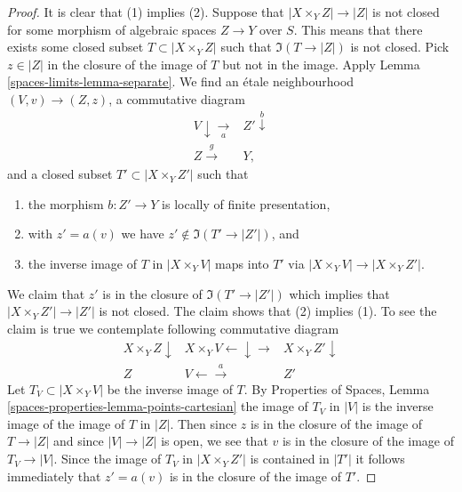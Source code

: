 \begin{proof}
It is clear that (1) implies (2).
Suppose that $|X \times_Y Z| \to |Z|$ is not closed for some
morphism of algebraic spaces $Z \to Y$ over $S$. This means that there
exists some closed subset $T \subset |X \times_Y Z|$
such that $\Im(T \to |Z|)$ is not closed. Pick $z \in |Z|$
in the closure of the image of $T$ but not in the image.
Apply Lemma \ref{spaces-limits-lemma-separate}.
We find an \'etale neighbourhood $(V, v) \to (Z, z)$, a commutative diagram
$$
\begin{array}{cc}V \downarrow\underset{a}{\longrightarrow} & Z' \overset{b}{\downarrow} \\ Z \overset{g}{\longrightarrow} & Y,\end{array}
$$
and a closed subset $T' \subset |X \times_Y Z'|$ such that
\begin{enumerate}
\item the morphism $b : Z' \to Y$ is locally of finite presentation,
\item with $z' = a(v)$ we have $z' \not \in \Im(T' \to |Z'|)$, and
\item the inverse image of $T$ in $|X \times_Y V|$ maps into $T'$ via
$|X \times_Y V| \to |X \times_Y Z'|$.
\end{enumerate}
We claim that $z'$ is in the closure of $\Im(T' \to |Z'|)$
which implies that $|X \times_Y Z'| \to |Z'|$ is not closed.
The claim shows that (2) implies (1).
To see the claim is true we contemplate
following commutative diagram
$$
\begin{array}{ccc}X \times_Y Z \downarrow & X \times_Y V \longleftarrow\downarrow\longrightarrow & X \times_Y Z' \downarrow \\ Z & V \longleftarrow\overset{a}{\longrightarrow} & Z'\end{array}
$$
Let $T_V \subset |X \times_Y V|$ be the inverse image of $T$.
By Properties of Spaces, Lemma \ref{spaces-properties-lemma-points-cartesian}
the image of $T_V$ in $|V|$ is the inverse image of the image
of $T$ in $|Z|$. Then since $z$ is in the closure of the image of
$T \to |Z|$ and since $|V| \to |Z|$ is open, we see that $v$ is in
the closure of the image of $T_V \to |V|$. Since the image of
$T_V$ in $|X \times_Y Z'|$ is contained in $|T'|$ it follows
immediately that $z' = a(v)$ is in the closure of the image of $T'$.


\end{proof}
